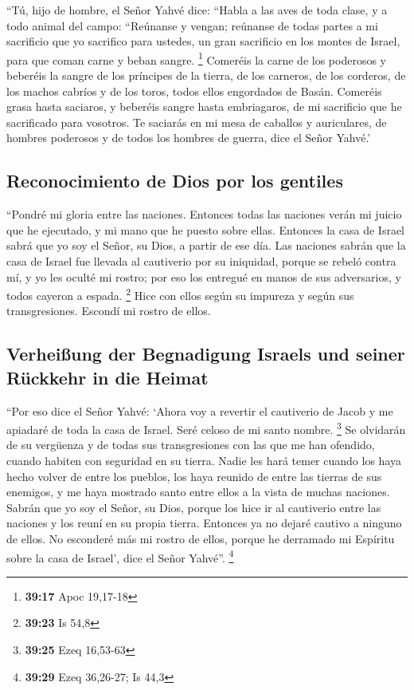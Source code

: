  ``Tú, hijo de hombre, el Señor Yahvé dice: ``Habla a las
aves de toda clase, y a todo animal del campo: ``Reúnanse y vengan;
reúnanse de todas partes a mi sacrificio que yo sacrifico para ustedes,
un gran sacrificio en los montes de Israel, para que coman carne y beban
sangre. \footnote{\textbf{39:17} Apoc 19,17-18}  Comeréis
la carne de los poderosos y beberéis la sangre de los príncipes de la
tierra, de los carneros, de los corderos, de los machos cabríos y de los
toros, todos ellos engordados de Basán.  Comeréis grasa
hasta saciaros, y beberéis sangre hasta embriagaros, de mi sacrificio
que he sacrificado para vosotros.  Te saciarás en mi mesa
de caballos y auriculares, de hombres poderosos y de todos los hombres
de guerra, dice el Señor Yahvé.'

\hypertarget{reconocimiento-de-dios-por-los-gentiles}{%
\subsection{Reconocimiento de Dios por los
gentiles}\label{reconocimiento-de-dios-por-los-gentiles}}

 ``Pondré mi gloria entre las naciones. Entonces todas
las naciones verán mi juicio que he ejecutado, y mi mano que he puesto
sobre ellas.  Entonces la casa de Israel sabrá que yo soy
el Señor, su Dios, a partir de ese día.  Las naciones
sabrán que la casa de Israel fue llevada al cautiverio por su iniquidad,
porque se rebeló contra mí, y yo les oculté mi rostro; por eso los
entregué en manos de sus adversarios, y todos cayeron a espada.
\footnote{\textbf{39:23} Is 54,8}  Hice con ellos según
su impureza y según sus transgresiones. Escondí mi rostro de ellos.

\hypertarget{verheiuxdfung-der-begnadigung-israels-und-seiner-ruxfcckkehr-in-die-heimat}{%
\subsection{Verheißung der Begnadigung Israels und seiner Rückkehr in
die
Heimat}\label{verheiuxdfung-der-begnadigung-israels-und-seiner-ruxfcckkehr-in-die-heimat}}

 ``Por eso dice el Señor Yahvé: `Ahora voy a revertir el
cautiverio de Jacob y me apiadaré de toda la casa de Israel. Seré celoso
de mi santo nombre. \footnote{\textbf{39:25} Ezeq 16,53-63}
 Se olvidarán de su vergüenza y de todas sus
transgresiones con las que me han ofendido, cuando habiten con seguridad
en su tierra. Nadie les hará temer  cuando los haya hecho
volver de entre los pueblos, los haya reunido de entre las tierras de
sus enemigos, y me haya mostrado santo entre ellos a la vista de muchas
naciones.  Sabrán que yo soy el Señor, su Dios, porque
los hice ir al cautiverio entre las naciones y los reuní en su propia
tierra. Entonces ya no dejaré cautivo a ninguno de ellos.
 No esconderé más mi rostro de ellos, porque he derramado
mi Espíritu sobre la casa de Israel', dice el Señor Yahvé''. \footnote{\textbf{39:29}
  Ezeq 36,26-27; Is 44,3}

